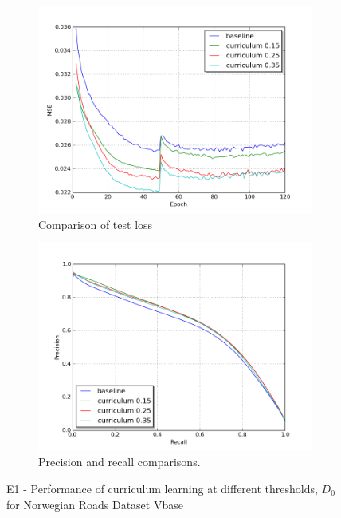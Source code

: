 \begin{figure}
\begin{subfigure}{0.48\textwidth}
\includegraphics[width=\linewidth]{figs/E1/E1-lc-test.png}
\caption{Comparison of test loss} \label{fig:E1_curr_norway_loss}
\end{subfigure}
\hspace*{\fill} %
\begin{subfigure}{0.48\textwidth}
\includegraphics[width=\linewidth]{figs/E1/E1-pr-test.png}
\caption{Precision and recall comparisons.} \label{fig:E1_curr_norway_pr}
\end{subfigure}
\hspace*{\fill} %
\caption{E1 - Performance of curriculum learning at different thresholds, $D_{0}$ for Norwegian Roads Dataset Vbase} \label{fig:E1_curriculum_norway}
\end{figure}

